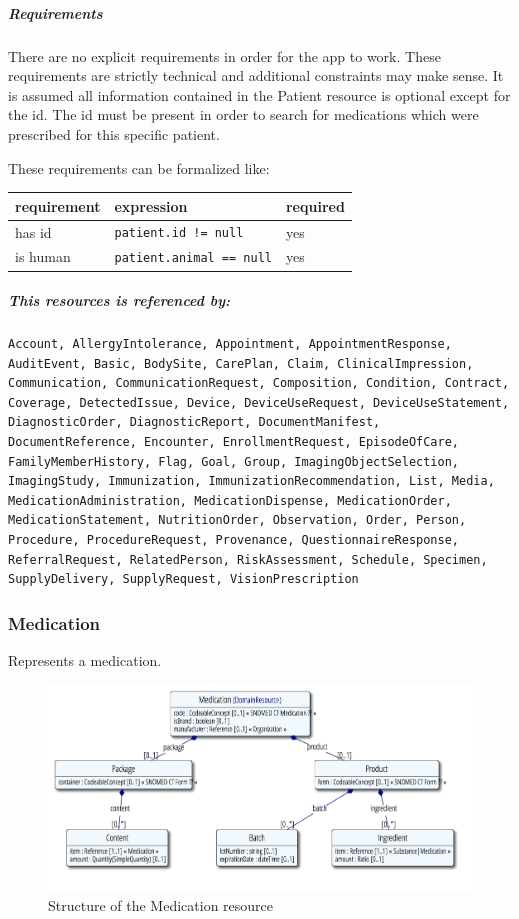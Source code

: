 \documentclass{article}
\begin{document}
\subparagraph{Requirements}\label{res:patient:requirements}

There are no explicit requirements in order for the app to work.
These requirements are strictly technical and additional constraints may make sense.
It is assumed all information contained in the Patient resource is optional except for the id.
The id must be present in order to search for medications which were prescribed for this specific patient.

These requirements can be formalized like:
\begin{longtable}[]{@{}lll@{}}
\toprule
requirement & expression & required\tabularnewline
\midrule
has id & \texttt{patient.id != null} & yes\tabularnewline
is human & \texttt{patient.animal == null} & yes\tabularnewline
\bottomrule
\end{longtable}

\subparagraph{This resources is referenced by:}\label{res:patient:referenced-by}

\begin{lstlisting}[breaklines]
Account, AllergyIntolerance, Appointment, AppointmentResponse, AuditEvent, Basic, BodySite, CarePlan, Claim, ClinicalImpression, Communication, CommunicationRequest, Composition, Condition, Contract, Coverage, DetectedIssue, Device, DeviceUseRequest, DeviceUseStatement, DiagnosticOrder, DiagnosticReport, DocumentManifest, DocumentReference, Encounter, EnrollmentRequest, EpisodeOfCare, FamilyMemberHistory, Flag, Goal, Group, ImagingObjectSelection, ImagingStudy, Immunization, ImmunizationRecommendation, List, Media, MedicationAdministration, MedicationDispense, MedicationOrder, MedicationStatement, NutritionOrder, Observation, Order, Person, Procedure, ProcedureRequest, Provenance, QuestionnaireResponse, ReferralRequest, RelatedPerson, RiskAssessment, Schedule, Specimen, SupplyDelivery, SupplyRequest, VisionPrescription
\end{lstlisting}

\subsubsection{Medication}\label{res:medication}

Represents a medication.

\begin{figure}[H]
\centering
\includegraphics[width=\linewidth]{resources/FHIR/Medication/Medication-UML.png}
\caption{Structure of the Medication resource}
\label{fig:structure-medication}
\end{figure}
\end{document}
